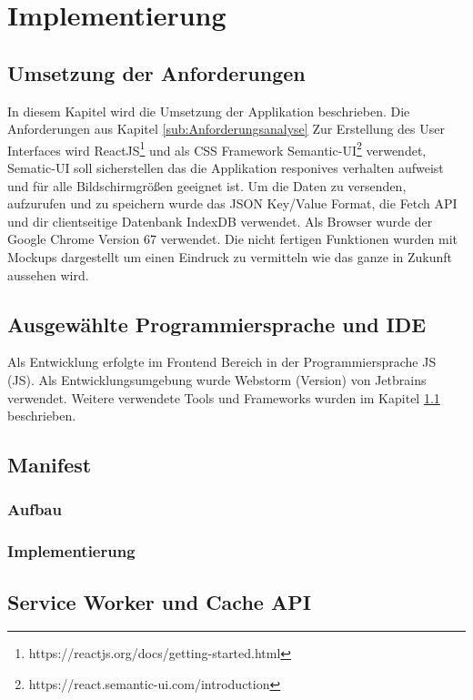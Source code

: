 \chapter{Implementierung}\label{chap:Implementierung}
\thispagestyle{standard}
\pagestyle{standard}

\section{Umsetzung der Anforderungen}\label{sub:Umsetzung der Anforderungen}
In diesem Kapitel wird die Umsetzung der Applikation beschrieben. Die Anforderungen aus Kapitel \ref{sub:Anforderungsanalyse}
Zur Erstellung des User Interfaces wird ReactJS\footnote{https://reactjs.org/docs/getting-started.html} und als CSS Framework Semantic-UI\footnote{https://react.semantic-ui.com/introduction} verwendet, Sematic-UI soll sicherstellen das die Applikation responives verhalten aufweist und für alle Bildschirmgrößen geeignet ist. Um die Daten zu versenden, aufzurufen und zu speichern wurde das JSON Key/Value Format, die Fetch API und dir clientseitige Datenbank IndexDB verwendet.
Als Browser wurde der Google Chrome Version 67 verwendet.
Die nicht fertigen Funktionen wurden mit Mockups dargestellt um einen Eindruck zu vermitteln wie das ganze in Zukunft aussehen wird.

\section{Ausgewählte Programmiersprache und IDE}
Als Entwicklung erfolgte im Frontend Bereich in der Programmiersprache \acl{JS} (\acs{JS}). Als
Entwicklungsumgebung wurde Webstorm (Version) von Jetbrains verwendet. Weitere verwendete Tools und Frameworks wurden im Kapitel \ref{sub:Umsetzung der Anforderungen} beschrieben.


\section{Manifest}
\subsection{Aufbau}
\subsection{Implementierung}



\section{Service Worker und Cache API}

